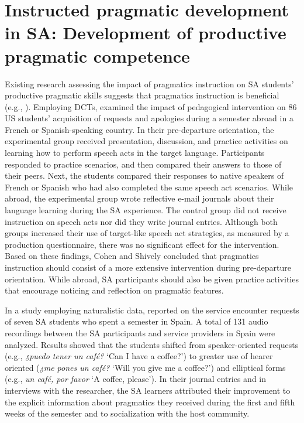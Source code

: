 \documentclass[output=paper]{langscibook}
\begin{document}
\section{Instructed pragmatic development in SA: Development of productive pragmatic competence}

  Existing research assessing the impact of pragmatics instruction on SA students’ productive pragmatic skills suggests that pragmatics instruction is beneficial (e.g., \citealt{CohenShively2007,DiBartolomeoJung2019,Halenko2018,HernándezBoero2018a,HernándezBoero2018b,Morris2017,Shively2011}). Employing DCTs, \citet{CohenShively2007} examined the impact of pedagogical intervention on 86 US students’ acquisition of requests and apologies during a semester abroad in a French or Spanish-speaking country. In their pre-departure orientation, the experimental group received presentation, discussion, and practice activities on learning how to perform speech acts in the target language. Participants responded to practice scenarios, and then compared their answers to those of their peers. Next, the students compared their responses to native speakers of French or Spanish who had also completed the same speech act scenarios. While abroad, the experimental group wrote reflective e-mail journals about their language learning during the SA experience. The control group did not receive instruction on speech acts nor did they write journal entries. Although both groups increased their use of target-like speech act strategies, as measured by a production questionnaire, there was no significant effect for the intervention. Based on these findings, Cohen and Shively concluded that pragmatics instruction should consist of a more extensive intervention during pre-departure orientation. While abroad, SA participants should also be given practice activities that encourage noticing and reflection on pragmatic features.

  In a study employing naturalistic data, \citet{Shively2011} reported on the service encounter requests of seven SA students who spent a semester in Spain. A total of 131 audio recordings between the SA participants and service providers in Spain were analyzed. Results showed that the students shifted from speaker-oriented requests (e.g., \textit{¿puedo tener un café?} ‘Can I have a coffee?’) to greater use of hearer oriented (\textit{¿me pones un café?} ‘Will you give me a coffee?’) and elliptical forms (e.g., \textit{un café, por favor} ‘A coffee, please’). In their journal entries and in interviews with the researcher, the SA learners attributed their improvement to the explicit information about pragmatics they received during the first and fifth weeks of the semester and to socialization with the host community.
\end{document}

